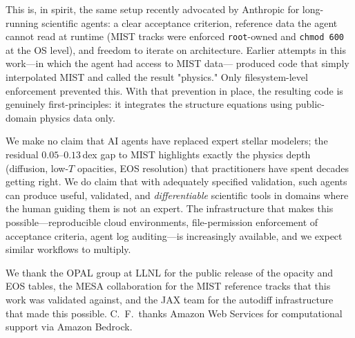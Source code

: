 \documentclass[twocolumn]{aastex631}
\newcommand{\code}[1]{\texttt{#1}}
\begin{document}
This is, in spirit, the same setup recently advocated by Anthropic
\citep{2026anthropic.LRA} for long-running scientific agents: a clear
acceptance criterion, reference data the agent cannot read at runtime
(MIST tracks were enforced \code{root}-owned and \code{chmod 600} at
the OS level), and freedom to iterate on architecture. Earlier
attempts in this work---in which the agent had access to MIST data---
produced code that simply interpolated MIST and called the result
"physics." Only filesystem-level enforcement prevented this. With
that prevention in place, the resulting code is genuinely first-principles:
it integrates the structure equations using public-domain physics
data only.

We make no claim that AI agents have replaced expert stellar
modelers; the residual $0.05$--$0.13\,$dex gap to MIST highlights
exactly the physics depth (diffusion, low-$T$ opacities, EOS
resolution) that practitioners have spent decades getting right. We do
claim that with adequately specified validation, such agents can
produce useful, validated, and \emph{differentiable} scientific tools
in domains where the human guiding them is not an expert. The
infrastructure that makes this possible---reproducible cloud
environments, file-permission enforcement of acceptance criteria,
agent log auditing---is increasingly available, and we expect
similar workflows to multiply.

\begin{acknowledgments}
We thank the OPAL group at LLNL for the public release of the opacity
and EOS tables, the MESA collaboration for the MIST reference tracks
that this work was validated against, and the JAX
\citep{2018arXiv...jax} team for the autodiff infrastructure that made
this possible. C.~F.\ thanks Amazon Web Services for computational
support via Amazon Bedrock.
\end{acknowledgments}

\end{document}
